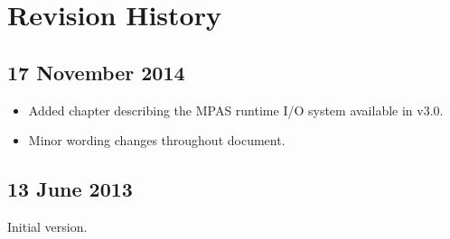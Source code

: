 
\chapter{Revision History}

\section*{17 November 2014}

\begin{itemize}
\item Added chapter describing the MPAS runtime I/O system available in v3.0.
\item Minor wording changes throughout document.
\end{itemize}

\section*{13 June 2013}

Initial version.
